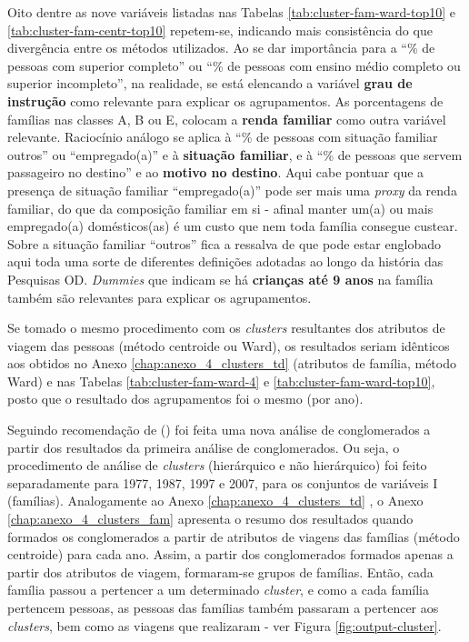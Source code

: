 Oito dentre as nove variáveis listadas nas Tabelas  \ref{tab:cluster-fam-ward-top10} e \ref{tab:cluster-fam-centr-top10} repetem-se, indicando mais consistência do que divergência entre os métodos utilizados. 
Ao se dar importância para a ``\% de pessoas com superior completo'' ou ``\% de pessoas com ensino médio completo ou superior incompleto'', na realidade, se está elencando a variável \textbf{grau de instrução} como relevante para explicar os agrupamentos. As porcentagens de famílias nas classes A, B ou E, colocam a \textbf{renda familiar} como outra variável relevante.
Raciocínio análogo se aplica à ``\% de pessoas com situação familiar outros'' ou ``empregado(a)'' e à \textbf{situação familiar}, e à ``\% de pessoas que servem passageiro no destino'' e ao \textbf{motivo no destino}.
Aqui cabe pontuar que a presença de situação familiar ``empregado(a)'' pode ser mais uma \textit{proxy} da renda familiar, do que da composição familiar em si - afinal manter um(a) ou mais empregado(a) domésticos(as) é um custo que nem toda família consegue custear. 
Sobre a situação familiar ``outros'' fica a ressalva de que pode estar englobado aqui toda uma sorte de diferentes definições adotadas ao longo da história das Pesquisas OD.
\textit{Dummies} que indicam se há \textbf{crianças até 9 anos} na família também são relevantes para explicar os agrupamentos.

Se tomado o mesmo procedimento com os \textit{clusters} resultantes dos atributos de viagem das pessoas (método centroide ou Ward), os resultados seriam idênticos aos obtidos no Anexo \ref{chap:anexo_4_clusters_td} (atributos de família, método Ward) e nas Tabelas \ref{tab:cluster-fam-ward-4} e \ref{tab:cluster-fam-ward-top10}, posto que o resultado dos agrupamentos foi o mesmo (por ano).

Seguindo recomendação de  (\citeyear{VESPUCCI2003}) foi feita uma nova análise de conglomerados a partir dos resultados da primeira análise de conglomerados. Ou seja, o procedimento de análise de \textit{clusters} (hierárquico e não hierárquico) foi feito separadamente para 1977, 1987, 1997 e 2007, para os conjuntos de variáveis I (famílias). %
Analogamente ao Anexo \ref{chap:anexo_4_clusters_td} , o Anexo \ref{chap:anexo_4_clusters_fam} apresenta o resumo dos resultados quando formados os conglomerados a partir de atributos de viagens das famílias (método centroide) para cada ano.
Assim, a partir dos conglomerados formados apenas a partir dos atributos de viagem, formaram-se grupos de famílias. Então, cada família passou a pertencer a um determinado \textit{cluster}, e como a cada família pertencem pessoas, as pessoas das famílias também passaram a pertencer aos \textit{clusters}, bem como as viagens que realizaram - ver Figura \ref {fig:output-cluster}.

